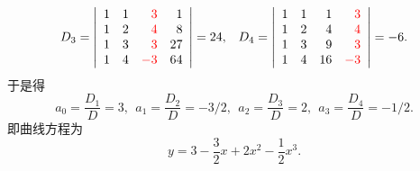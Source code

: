 \begin{jie}
$$\begin{array}{ll}
    D_3 = \left|
    \begin{array}{rrrr}
      1 & 1 & \textcolor{red}{3}  &  1 \\
      1 & 2 & \textcolor{red}{4}  &  8 \\
      1 & 3 & \textcolor{red}{3}  & 27 \\
      1 & 4 & \textcolor{red}{-3} & 64
    \end{array}
                         \right|= 24, &
                                        D_4 = \left|
                                        \begin{array}{rrrr}
                                          1 & 1 &  1 & \textcolor{red}{3} \\
                                          1 & 2 &  4 & \textcolor{red}{4} \\
                                          1 & 3 &  9 & \textcolor{red}{3} \\
                                          1 & 4 & 16 & \textcolor{red}{-3}
                                        \end{array}
                                                       \right|= -6.
  \end{array}
  $$
  于是得
  $$
  a_0 = \frac{D_1}D = 3,  \ \ 
  a_1 = \frac{D_2}D = -3/2, \ \ 
  a_2 = \frac{D_3}D = 2, \ \ 
  a_3 = \frac{D_4}D = -1/2.
  $$
  即曲线方程为
  $$
  y = 3 - \frac 32 x + 2 x^2 - \frac 12 x^3.
  $$
\end{jie}

